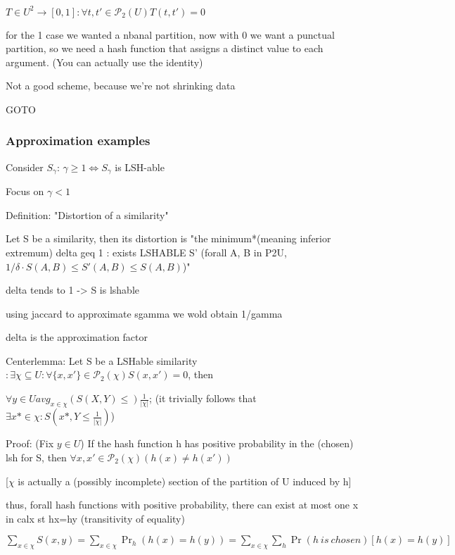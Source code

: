 \documentclass{report}
\begin{document}
	$T \in U^2 \to [0, 1] : \forall {t, t'} \in \mathcal{P}_2(U) T(t, t') = 0$
	
	for the 1 case we wanted a nbanal partition, now with 0 we want a punctual partition, so we need a hash function that assigns a distinct value to each argument. (You can actually use the identity)
	
	Not a good scheme, because we're not shrinking data
	
	GOTO %
	
	\subsubsection{Approximation examples}
	
	Consider $S_\gamma$: $\gamma \geq 1 \Leftrightarrow S_\gamma$ is LSH-able
	
	Focus on $\gamma < 1$
	
	Definition: "Distortion of a similarity"
	
	Let S be a similarity, then its distortion is "the minimum*(meaning inferior extremum) delta geq 1 : exists LSHABLE S' (forall {A, B} in P2U, $1/\delta \cdot S(A, B) \leq S'(A, B) \leq S(A, B)$)"
	
	delta tends to 1 -> S is lshable
	
	using jaccard to approximate sgamma we wold obtain 1/gamma
	
	delta is the approximation factor
	
	
	Centerlemma: Let S be a LSHable similarity $ : \exists \chi \subseteq U : \forall \{x, x'\} \in \mathcal{P}_2(\chi) S(x, x')=0$, then
	
	$\forall y \in U avg_{x \in \chi}(S(X, Y) \leq) \frac{1}{|\chi|}$; (it trivially follows that $\exists x* \in \chi : S(x*, Y \leq \frac{1}{|\chi|})$)
	
	Proof: (Fix $y \in U$) If the hash function h has positive probability in the (chosen) lsh for S, then $\forall {x, x'} \in \mathcal{P}_2(\chi) (h(x)\neq h(x'))$
	
	[$\chi$ is actually a (possibly incomplete) section of the partition of U induced by h]
	
	thus, forall hash functions with positive probability, there can exist at most one x in calx st hx=hy (transitivity of equality)
	
	$\sum_{x \in \chi}S(x, y) = \sum_{x \in \chi}\Pr_h(h(x)=h(y)) = \sum_{x \in \chi}\sum_{h}\Pr(h\ is\ chosen)[h(x)=h(y)]$
	
\end{document}
